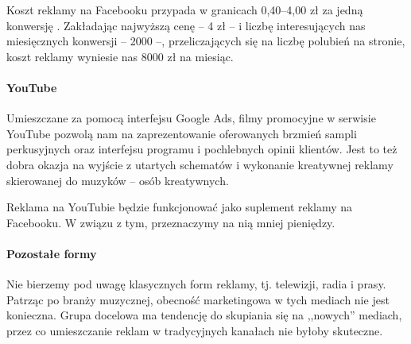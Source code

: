 \documentclass[12pt]{article}
\begin{document}
Koszt reklamy na Facebooku przypada w granicach 0,40--4,00 zł za jedną konwersję \cite{facebook}.
Zakładając najwyższą cenę -- 4 zł -- i liczbę interesujących nas miesięcznych konwersji -- 2000 --, przeliczających się na liczbę polubień na stronie, koszt reklamy wyniesie nas 8000 zł na miesiąc.

\paragraph{YouTube}

Umieszczane za pomocą interfejsu Google Ads, filmy promocyjne w serwisie YouTube pozwolą nam na zaprezentowanie oferowanych brzmień sampli perkusyjnych oraz interfejsu programu i pochlebnych opinii klientów.
Jest to też dobra okazja na wyjście z utartych schematów i wykonanie kreatywnej reklamy skierowanej do muzyków -- osób kreatywnych.

Reklama na YouTubie będzie funkcjonować jako suplement reklamy na Facebooku.
W związu z tym, przeznaczymy na nią mniej pieniędzy.



\paragraph{Pozostałe formy}

Nie bierzemy pod uwagę klasycznych form reklamy, tj. telewizji, radia i prasy.
Patrząc po branży muzycznej, obecność marketingowa w tych mediach nie jest konieczna.
Grupa docelowa ma tendencję do skupiania się na ,,nowych'' mediach, przez co umieszczanie reklam w tradycyjnych kanałach nie byłoby skuteczne.
\end{document}
